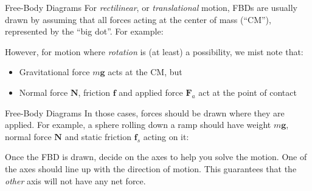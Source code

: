\documentclass[12pt,compress,aspectratio=169]{beamer}
\begin{document}
\begin{frame}{Free-Body Diagrams}
  For \emph{rectilinear}, or \emph{translational} motion, FBDs are usually drawn
  by assuming that all forces acting at the center of mass (``CM''),
  represented by the ``big dot''. For example:
  \begin{center}
  \end{center}
  However, for motion where \emph{rotation} is (at least) a possibility, we
  mist note that:
  \begin{itemize}
  \item Gravitational force $m\bm g$ acts at the CM, but
  \item Normal force $\bm N$, friction $\bm f$ and applied force $\bm F_a$
    act at the point of contact
  \end{itemize}
\end{frame}



\begin{frame}{Free-Body Diagrams}
  In those cases, forces should be drawn where they are applied. For example, a
  sphere rolling down a ramp should have weight $m\bm g$, normal force $\bm N$
  and static friction $\bm f_s$ acting on it:
  \begin{center}
  \end{center}
  Once the FBD is drawn, decide on the axes to help you solve the motion. One of
  the axes should line up with the direction of motion. This guarantees that
  the \emph{other} axis will not have any net force.
\end{frame}
\end{document}
